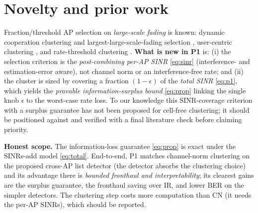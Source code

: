 \documentclass[11pt]{article}
\begin{document}
\section{Novelty and prior work}
Fraction/threshold AP selection on \emph{large-scale fading} is known: dynamic cooperation
clustering and largest-large-scale-fading selection \cite{bjornson2020scalable,ngo2018totalenergy},
user-centric clustering \cite{buzzi2017usercentric,interdonato2019ubiquitous}, and rate-threshold
clustering \cite{mashdour2024clustering}. \textbf{What is new in P1} is: (i) the selection criterion
is the \emph{post-combining per-AP SINR} \eqref{eq:sinr} (interference- and estimation-error aware),
not channel norm or an interference-free rate; and (ii) the cluster is sized by covering a fraction
$(1-\epsilon)$ of the \emph{total SINR} \eqref{eq:p1}, which yields the \emph{provable
information-surplus bound} \eqref{eq:prop} linking the single knob $\epsilon$ to the worst-case rate
loss. To our knowledge this SINR-coverage criterion with a surplus guarantee has not been proposed
for cell-free clustering; it should be positioned against \cite{bjornson2020scalable,ngo2018totalenergy,
mashdour2024clustering} and verified with a final literature check before claiming priority.

\begin{keybox}
\textbf{Honest scope.} The information-loss guarantee \eqref{eq:prop} is exact under the
SINRs-add model \eqref{eq:total}. End-to-end, P1 matches channel-norm clustering on the proposed
cross-AP list detector (the detector absorbs the clustering choice) and its advantage there is
\emph{bounded fronthaul and interpretability}; its clearest gains are the surplus guarantee, the
fronthaul saving over IR, and lower BER on the simpler detectors. The clustering step costs more
computation than CN (it needs the per-AP SINRs), which should be reported.
\end{keybox}
\end{document}
